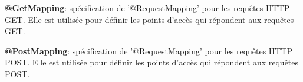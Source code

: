         \textbf{@GetMapping}: spécification de '@RequestMapping' pour les requêtes HTTP GET. Elle est utilisée pour définir les points d'accès qui répondent aux requêtes GET.
        \medskip

        \textbf{@PostMapping}: spécification de '@RequestMapping' pour les requêtes HTTP POST. Elle est utilisée pour définir les points d'accès qui répondent aux requêtes POST.
        \medskip

        
